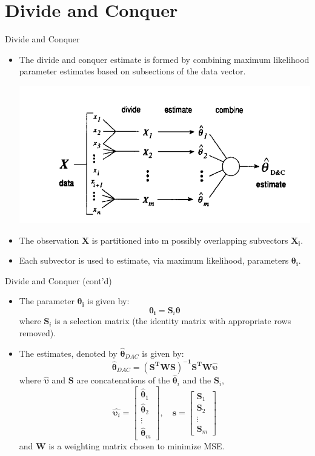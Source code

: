 \documentclass[10pt]{beamer}
\begin{document}
\section{Divide and Conquer}
\begin{frame}{Divide and Conquer}
\begin{itemize}
  \item The divide and conquer estimate is formed by combining maximum likelihood parameter estimates based on subsections of the data vector.
  \vfill
    \begin{center}
      \includegraphics[scale=0.6]{img/DAC.PNG}
    \end{center}
 \item  The observation $\mathbf{X}$ is partitioned into m possibly overlapping subvectors $\mathbf{X_i}$.
 \item  Each subvector is used to estimate, via maximum likelihood, parameters $\boldsymbol{\theta_i}$.
 \end{itemize}
\end{frame}
\begin{frame}{Divide and Conquer (cont'd)}
 \begin{itemize}
 \item The parameter  $\boldsymbol{\theta_i}$ is given by: 
       $$ \boldsymbol{\theta_i} = \mathbf{S}_i\boldsymbol{\theta} $$
       where $\mathbf{S}_i$ is a \alert{selection matrix} (the identity matrix with appropriate rows removed).
 \item The estimates, denoted by $\hat{\boldsymbol{\theta}}_{DAC}$ is given by:
       $$ \hat{\boldsymbol{\theta}}_{DAC} = \mathbf{(S^TWS)^{-1}S^T W} \hat{\boldsymbol{\upsilon}} $$
       where $\boldsymbol{\hat{\upsilon}}$ and $\mathbf{S}$ are concatenations of the $\hat{\boldsymbol{\theta}}_i$ and the $\mathbf{S}_i$,
       $$ \hat{\boldsymbol{\upsilon}_i}=\begin{bmatrix}\hat{\boldsymbol{\theta}}_1\\\hat{\boldsymbol{\theta}}_2\\\vdots\\\hat{\boldsymbol{\theta}}_m\end{bmatrix},\quad
            \mathbf{s}=\begin{bmatrix}\mathbf{S}_1\\\mathbf{S}_2\\\vdots\\\mathbf{S}_m\end{bmatrix} $$
 and $\mathbf{W}$ is a weighting matrix chosen to minimize MSE.       
 \end{itemize}
\end{frame}
\end{document}
